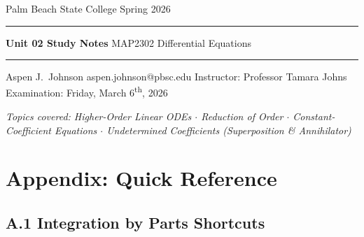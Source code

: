 \documentclass[10pt]{article}
\begin{document}
\thispagestyle{empty}
\vspace*{3cm}

\begin{center}
    {\fontsize{13}{13}\selectfont\sffamily Palm Beach State College \quad\textbullet\quad Spring 2026}
    \vskip 20pt
    \rule{0.6\linewidth}{0.4pt}
    \vskip 20pt
    {\fontsize{28}{28}\selectfont\bfseries\sffamily Unit 02 Study Notes}
    \vskip 12pt
    {\fontsize{16}{16}\selectfont\rmfamily MAP2302 \quad Differential Equations}
    \vskip 20pt
    \rule{0.6\linewidth}{0.4pt}
    \vskip 24pt
    {\fontsize{15}{15}\selectfont\rmfamily Aspen J.\ Johnson}
    \vskip 6pt
    {\fontsize{11}{11}\selectfont\ttfamily aspen.johnson@pbsc.edu}
    \vskip 30pt
    {\fontsize{11}{11}\selectfont\rmfamily
        Instructor: Professor Tamara Johns\\[4pt]
        Examination: Friday, March 6\textsuperscript{th}, 2026
    }
\end{center}

\vfill

\begin{center}
{\small\itshape
Topics covered: Higher-Order Linear ODEs $\cdot$ Reduction of Order $\cdot$
Constant-Coefficient Equations $\cdot$ Undetermined Coefficients (Superposition \& Annihilator)}
\end{center}
\newpage




\microtoc

\newpage
\section*{Appendix: Quick Reference}

\subsection*{A.1 \quad Integration by Parts Shortcuts}
\end{document}

